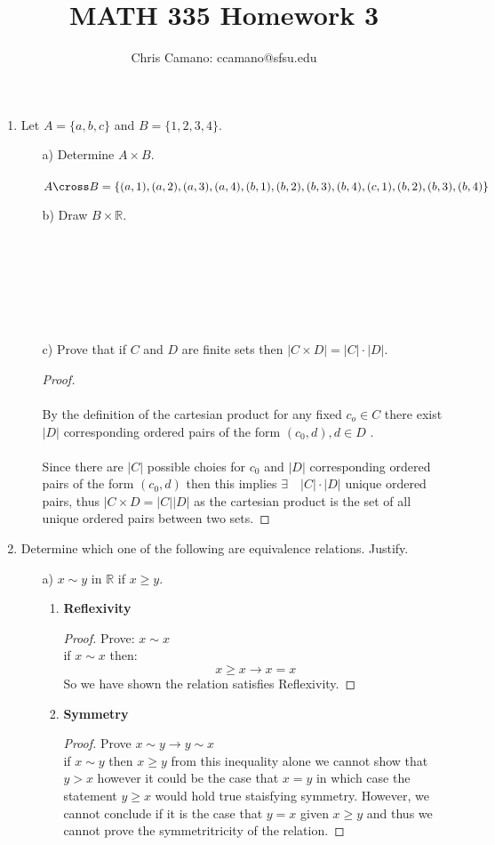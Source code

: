 \documentclass[11pt]{article}
\author{Chris Camano: ccamano@sfsu.edu}
\title{MATH 335  Homework 3 }
\date
\theoremstyle{definition}  %
\newcommand{\R}{\mathbb{R}}
\begin{document}
\maketitle
\begin{enumerate}

\item Let $A = \{a, b, c\}$ and $B = \{1,2,3,4\}$.
  \begin{itemize}
    \item[a)] Determine $A \times B$.\\\\
    $A\cross B=\{ (a,1),(a,2),(a,3),(a,4),(b,1),(b,2),(b,3),(b,4),(c,1),
    (b,2),(b,3),(b,4)\}$
    \item[b)] Draw $B \times \R$.\\\\\\\\\\\\\\

     \item[c)] Prove that if $C$ and $D$ are finite sets then $|C \times D| = |C| \cdot |D|$.
     \begin{proof}\\\\
       By the definition of the cartesian product for any fixed $c_o \in C$ there exist$ |D|$ corresponding ordered pairs of the form $(c_0,d), d\in D$ .\\\\ Since there are $|C|$ possible choies for $c_0$ and $|D|$ corresponding ordered pairs of the form $(c_0,d)$ then this implies $\exists\quad  |C|\cdot |D|$ unique ordered pairs, thus $|C\times D=|C||D|$ as the cartesian product is the set of all unique ordered pairs between two sets.
   \end{proof}
   \end{itemize}
 \item Determine which one of the following are equivalence relations. Justify.
   \begin{itemize}
    \item[a)] $x \sim y$ in $\R$ if $x \geq y$.
    \begin{enumerate}
      \item \textbf{Reflexivity}
      \begin{proof}
        Prove: $x\sim x$\\
        if $x\sim x$ then:
        \[
          x\geq x \rightarrow x=x
        \]
        So we have shown the relation satisfies Reflexivity.
      \end{proof}
      \item \textbf{Symmetry}
      \begin{proof}
        Prove $x \sim y \rightarrow y \sim x $\\
        if $x \sim y$ then $x \geq y$ from this inequality alone we cannot show that $y>x$ however it could be the case that $x=y$ in which case the statement $y \geq x$ would hold true staisfying symmetry. However, we cannot conclude if it is the case that $y=x$ given $x\geq y$ and thus we cannot prove the symmetritricity of the relation.


\end{proof}
\end{enumerate}
\end{itemize}
\end{enumerate}
\end{document}
